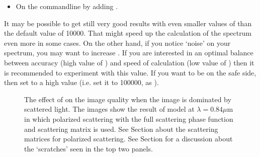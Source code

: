\documentclass[letterpaper,10pt,english]{sphinxmanual}
\begin{document}
\begin{itemize}
\begin{itemize}
\item {} 
On the command\sphinxhyphen{}line by adding .

\end{itemize}

 It may be possible to get still very good results with even
smaller values of  than the default value of
10000. That might speed up the calculation of the spectrum even more in some
cases. On the other hand, if you notice ‘noise’ on your spectrum, you may want
to increase . If you are interested in an optimal balance
between accuracy (high value of ) and speed of calculation (low
value of ) then it is recommended to experiment with this value.
If you want to be on the safe side, then set  to a high value
(i.e. set it to 100000, as ).

\end{itemize}

\begin{figure}[htbp]
\centering
\capstart

\noindent{}
\caption{The effect of  on the image quality when the image is dominated
by scattered light. The images show the result of model
 at \(\lambda=0.84\mu\)m in which
polarized scattering with the full scattering phase function and scattering
matrix is used. See Section {\hyperref[\detokenize{dustradtrans:sec-polarized-scattering}]{}} about the
scattering matrices for polarized scattering. See Section
{\hyperref[\detokenize{dustradtrans:sec-single-multiple-scattering}]{}} for a discussion about the ‘scratches’
seen in the top two panels.}\label{\detokenize{dustradtrans:id1}}\label{\detokenize{dustradtrans:fig-polscat}}\end{figure}
\end{document}
